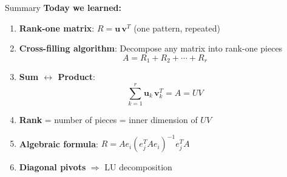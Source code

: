 \documentclass[10pt]{beamer}
\theoremstyle{definition}
\begin{document}

\begin{frame}{Summary}
\textbf{Today we learned:}

\begin{enumerate}
\item \textbf{Rank-one matrix}: $R = \mathbf{u}\,\mathbf{v}^T$ (one pattern, repeated)

\item \textbf{Cross-filling algorithm}: Decompose any matrix into rank-one pieces
$$A = R_1 + R_2 + \cdots + R_r$$

\item \textbf{Sum $\leftrightarrow$ Product}:
$$\sum_{k=1}^r \mathbf{u}_k\,\mathbf{v}_k^T = A = UV$$

\item \textbf{Rank} = number of pieces = inner dimension of $UV$

\item \textbf{Algebraic formula}: $R = Ae_i(e_j^TAe_i)^{-1}e_j^TA$

\item \textbf{Diagonal pivots} $\Rightarrow$ LU decomposition
\end{enumerate}
\end{frame}
\end{document}
